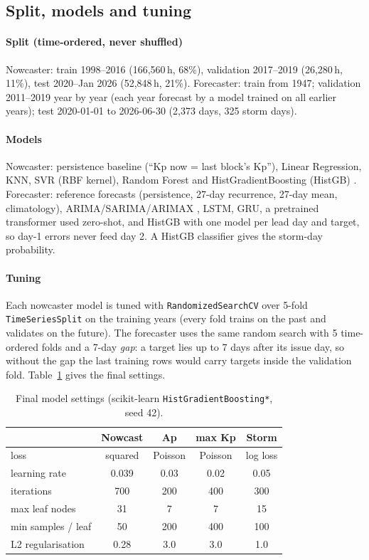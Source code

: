 \documentclass[conference,a4paper]{IEEEtran}
\newcommand{\code}[1]{\texttt{\footnotesize #1}}
\begin{document}
\subsection{Split, models and tuning}
\paragraph{Split (time-ordered, never shuffled)} Nowcaster: train 1998--2016 (166{,}560\,h, 68\%), validation
2017--2019 (26{,}280\,h, 11\%), test 2020--Jan 2026 (52{,}848\,h, 21\%). Forecaster: train from 1947; validation
2011--2019 year by year (each year forecast by a model trained on all earlier years); test 2020-01-01 to 2026-06-30
(2{,}373 days, 325 storm days).

\paragraph{Models} Nowcaster: persistence baseline (``Kp now = last block's Kp''), Linear Regression, KNN, SVR (RBF
kernel), Random Forest and HistGradientBoosting (HistGB) \cite{ke2017}. Forecaster: reference forecasts
(persistence, 27-day recurrence, 27-day mean, climatology), ARIMA/SARIMA/ARIMAX \cite{box2015}, LSTM, GRU, a
pretrained transformer used zero-shot, and HistGB with one model per lead day and target, so day-1 errors never
feed day 2. A HistGB classifier gives the storm-day probability.

\paragraph{Tuning} Each nowcaster model is tuned with \code{RandomizedSearchCV} over 5-fold \code{TimeSeriesSplit}
on the training years (every fold trains on the past and validates on the future). The forecaster uses the same
random search with 5 time-ordered folds and a 7-day \emph{gap}: a target lies up to 7 days after its issue day, so
without the gap the last training rows would carry targets inside the validation fold. Table~\ref{tab:params}
gives the final settings.

\begin{table}[h]\centering\footnotesize
\caption{Final model settings (scikit-learn \code{HistGradientBoosting*}, seed 42).}\label{tab:params}
\setlength{\tabcolsep}{3pt}
\begin{tabular}{@{}lcccc@{}}\toprule
 & Nowcast & Ap & max Kp & Storm\\\midrule
loss & squared & Poisson & Poisson & log loss\\
learning rate & 0.039 & 0.03 & 0.02 & 0.05\\
iterations & 700 & 200 & 400 & 300\\
max leaf nodes & 31 & 7 & 7 & 15\\
min samples / leaf & 50 & 200 & 400 & 100\\
L2 regularisation & 0.28 & 3.0 & 3.0 & 1.0\\\bottomrule
\end{tabular}
\end{table}
\end{document}
